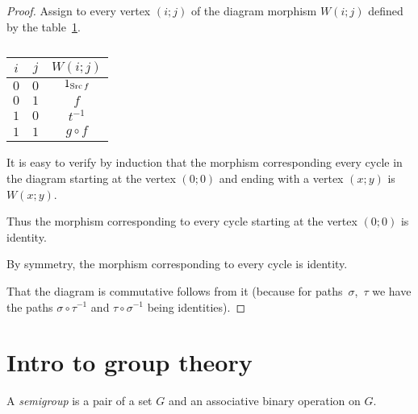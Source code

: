 \begin{proof}
Assign to every vertex $(i;j)$ of the diagram morphism $W(i;j)$
defined by the table~\ref{square-table}.

\begin{table}[ht]
\caption{\label{square-table}}


\begin{tabular}{|c|c|c|}
\hline 
$i$ & $j$ & $W(i;j)$\tabularnewline
\hline 
\hline 
$0$ & $0$ & $1_{\operatorname{Src} f}$\tabularnewline
\hline 
$0$ & $1$ & $f$\tabularnewline
\hline 
$1$ & $0$ & $t^{-1}$\tabularnewline
\hline 
$1$ & $1$ & $g\circ f$\tabularnewline
\hline 
\end{tabular}
\end{table}


It is easy to verify by induction that the morphism corresponding
every cycle in the diagram starting at the vertex $(0;0)$ and ending
with a vertex $(x;y)$ is $W(x;y)$.

Thus the morphism corresponding to every cycle starting at the vertex
$(0;0)$ is identity.

By symmetry, the morphism corresponding to every cycle is identity.

That the diagram is commutative follows from it (because for paths~$\sigma$,~$\tau$
we have the paths $\sigma\circ\tau^{-1}$ and $\tau\circ\sigma^{-1}$
being identities).
\end{proof}

\section{Intro to group theory}
\begin{defn}
A \emph{semigroup} is a pair of a set $G$ and an associative
binary operation on $G$.
\end{defn}

